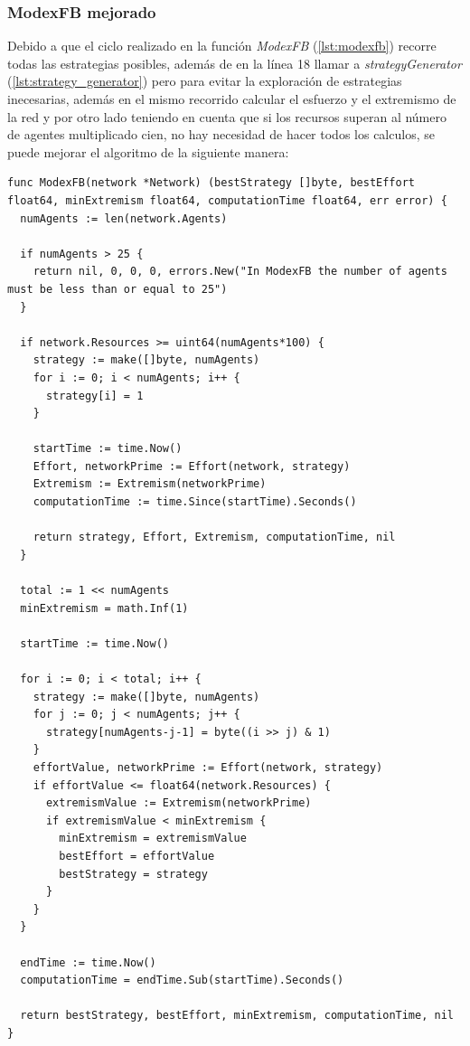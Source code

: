 \documentclass[letterpaper,10pt]{article}
\begin{document}
\subsubsection*{ModexFB mejorado}

Debido a que el ciclo realizado en la función \textit{ModexFB} (\ref{lst:modexfb}) recorre todas las estrategias posibles, además de en la línea 18 llamar a \textit{strategyGenerator} (\ref{lst:strategy_generator}) pero para evitar la exploración de estrategias inecesarias, además en el mismo recorrido calcular el esfuerzo y el extremismo de la red y por otro lado teniendo en cuenta que si los recursos superan al número de agentes multiplicado cien, no hay necesidad de hacer todos los calculos, se puede mejorar el algoritmo de la siguiente manera:
\begin{lstlisting}[caption={ModexFB mejorado}, label={lst:modexfb_mejorado}]
func ModexFB(network *Network) (bestStrategy []byte, bestEffort float64, minExtremism float64, computationTime float64, err error) {
  numAgents := len(network.Agents)

  if numAgents > 25 {
    return nil, 0, 0, 0, errors.New("In ModexFB the number of agents must be less than or equal to 25")
  }

  if network.Resources >= uint64(numAgents*100) {
    strategy := make([]byte, numAgents)
    for i := 0; i < numAgents; i++ {
      strategy[i] = 1
    }

    startTime := time.Now()
    Effort, networkPrime := Effort(network, strategy)
    Extremism := Extremism(networkPrime)
    computationTime := time.Since(startTime).Seconds()

    return strategy, Effort, Extremism, computationTime, nil
  }

  total := 1 << numAgents
  minExtremism = math.Inf(1)

  startTime := time.Now()

  for i := 0; i < total; i++ {
    strategy := make([]byte, numAgents)
    for j := 0; j < numAgents; j++ {
      strategy[numAgents-j-1] = byte((i >> j) & 1)
    }
    effortValue, networkPrime := Effort(network, strategy)
    if effortValue <= float64(network.Resources) {
      extremismValue := Extremism(networkPrime)
      if extremismValue < minExtremism {
        minExtremism = extremismValue
        bestEffort = effortValue
        bestStrategy = strategy
      }
    }
  }

  endTime := time.Now()
  computationTime = endTime.Sub(startTime).Seconds() 

  return bestStrategy, bestEffort, minExtremism, computationTime, nil
}
\end{lstlisting}
\end{document}
